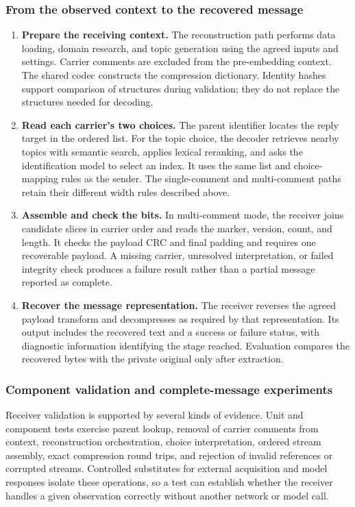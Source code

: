 \subsubsection{From the observed context to the recovered message}
\begin{enumerate}
\item \textbf{Prepare the receiving context.} The reconstruction path performs data loading, domain research, and topic generation using the agreed inputs and settings. Carrier comments are excluded from the pre-embedding context. The shared codec constructs the compression dictionary. Identity hashes support comparison of structures during validation; they do not replace the structures needed for decoding.
\item \textbf{Read each carrier's two choices.} The parent identifier locates the reply target in the ordered list. For the topic choice, the decoder retrieves nearby topics with semantic search, applies lexical reranking, and asks the identification model to select an index. It uses the same list and choice-mapping rules as the sender. The single-comment and multi-comment paths retain their different width rules described above.
\item \textbf{Assemble and check the bits.} In multi-comment mode, the receiver joins candidate slices in carrier order and reads the marker, version, count, and length. It checks the payload CRC and final padding and requires one recoverable payload. A missing carrier, unresolved interpretation, or failed integrity check produces a failure result rather than a partial message reported as complete.
\item \textbf{Recover the message representation.} The receiver reverses the agreed payload transform and decompresses as required by that representation. Its output includes the recovered text and a success or failure status, with diagnostic information identifying the stage reached. Evaluation compares the recovered bytes with the private original only after extraction.
\end{enumerate}

\subsubsection{Component validation and complete-message experiments}
Receiver validation is supported by several kinds of evidence. Unit and component tests exercise parent lookup, removal of carrier comments from context, reconstruction orchestration, choice interpretation, ordered stream assembly, exact compression round trips, and rejection of invalid references or corrupted streams. Controlled substitutes for external acquisition and model responses isolate these operations, so a test can establish whether the receiver handles a given observation correctly without another network or model call.

